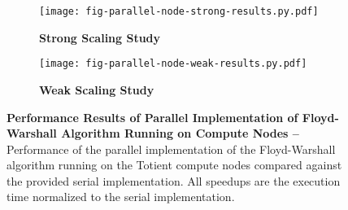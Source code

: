 
\begin{figure}[h]

  \begin{minipage}[t]{0.48\tw}
  \begin{subfigure}{\tw}

  \centering
  \texttt{[image: fig-parallel-node-strong-results.py.pdf]}
  \caption{\textbf{Strong Scaling Study}}
  \label{fig-parallel-node-strong-results}

  \end{subfigure}
  \end{minipage}%
  \hfill%
  \begin{minipage}[t]{0.48\tw}
  \begin{subfigure}{\tw}

  \centering
  \texttt{[image: fig-parallel-node-weak-results.py.pdf]}
  \caption{\textbf{Weak Scaling Study}}
  \label{fig-parallel-node-weak-results}

  \end{subfigure}
  \end{minipage}%

  \caption{\textbf{Performance Results of Parallel Implementation of
      Floyd-Warshall Algorithm Running on Compute Nodes --} Performance
    of the parallel implementation of the Floyd-Warshall algorithm
    running on the Totient compute nodes compared against the provided
    serial implementation. All speedups are the execution time normalized
    to the serial implementation. }

  \label{fig-parallel-node-results}

\end{figure}
